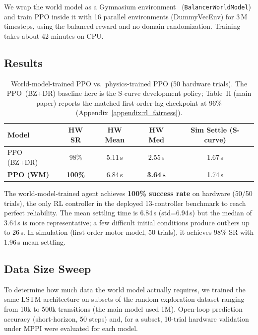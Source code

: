 We wrap the world model as a Gymnasium environment~\cite{towers2024gymnasium}
(\texttt{BalancerWorldModel}) and train PPO inside it with 16 parallel
environments (DummyVecEnv) for 3\,M timesteps, using the balanced reward and
no domain randomization. Training takes about 42 minutes on CPU.

\subsection{Results}

\begin{table}[!t]
\centering
\caption{World-model-trained PPO vs.\ physics-trained PPO (50 hardware trials).
  The PPO~(BZ+DR) baseline here is the S-curve development policy; Table~II
  (main paper) reports the matched first-order-lag checkpoint at 96\%
  (Appendix~\ref{appendix:rl_fairness}).}
\label{tab:wm_results}
\begin{tabular}{lcccc}
\toprule
Model & HW SR & HW Mean & HW Med & Sim Settle (S-curve) \\
\midrule
PPO (BZ+DR)           & 98\%   & 5.11\,s & 2.55\,s & 1.67\,s \\
\textbf{PPO (WM)}     & \textbf{100\%} & 6.84\,s & \textbf{3.64\,s} & 1.74\,s \\
\bottomrule
\end{tabular}
\end{table}

The world-model-trained agent achieves \textbf{100\% success rate} on hardware
(50/50 trials), the only RL controller in the deployed 13-controller benchmark
to reach perfect reliability.  The mean settling time is 6.84\,s (std=6.94\,s) but the
median of 3.64\,s is more representative; a few difficult initial
conditions produce outliers up to 26\,s.  In simulation (first-order motor model, 50 trials), it achieves
98\% SR with 1.96\,s mean settling.

\subsection{Data Size Sweep}

To determine how much data the world model actually requires, we trained
the same LSTM architecture on subsets of the random-exploration dataset
ranging from 10k to 500k transitions (the main model used 1M). Open-loop
prediction accuracy (short-horizon, 50 steps) and, for a subset,
10-trial hardware validation under MPPI were evaluated for each model.

